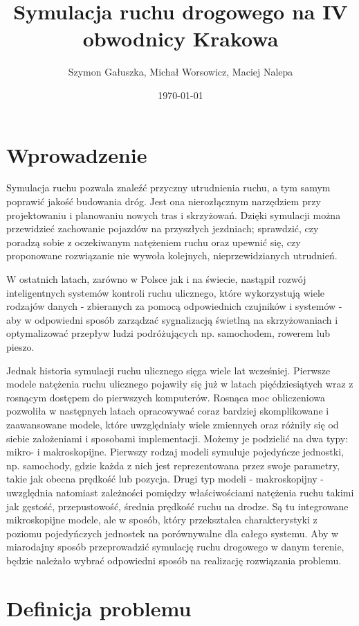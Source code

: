 \documentclass[a4paper,12pt]{article}
\title{Symulacja ruchu drogowego na IV obwodnicy Krakowa}
\author{Szymon Gałuszka, Michał Worsowicz, Maciej Nalepa}
\date{\today}
\begin{document}
	\maketitle
	
	\section{Wprowadzenie}
	Symulacja ruchu pozwala znaleźć przyczny utrudnienia ruchu, a tym samym poprawić jakość budowania dróg. Jest ona nierozłącznym narzędziem przy projektowaniu i planowaniu nowych tras i skrzyżowań. Dzięki symulacji można przewidzieć zachowanie pojazdów na przyszłych jezdniach; sprawdzić, czy poradzą sobie z oczekiwanym natężeniem ruchu oraz upewnić się, czy proponowane rozwiązanie nie wywoła kolejnych, nieprzewidzianych utrudnień.
	
	W ostatnich latach, zarówno w Polsce jak i na świecie, nastąpił rozwój inteligentnych systemów kontroli ruchu ulicznego, które wykorzystują wiele rodzajów danych - zbieranych za pomocą odpowiednich czujników i systemów - aby w  odpowiedni sposób zarządzać sygnalizacją świetlną na skrzyżowaniach i optymalizować przepływ ludzi podróżujących np. samochodem, rowerem lub pieszo.
	
	Jednak historia symulacji ruchu ulicznego sięga wiele lat wcześniej. Pierwsze modele natężenia ruchu ulicznego pojawiły się już w latach pięćdziesiątych wraz z rosnącym dostępem do pierwszych komputerów. Rosnąca moc obliczeniowa pozwoliła w następnych latach opracowywać coraz bardziej skomplikowane i zaawansowane modele, które uwzględniały wiele zmiennych oraz różniły się od siebie założeniami i sposobami implementacji. Możemy je podzielić na dwa typy: mikro- i makroskopijne. Pierwszy rodzaj modeli symuluje pojedyńcze jednostki, np. samochody, gdzie każda z nich jest reprezentowana przez swoje parametry, takie jak obecna prędkość lub pozycja. Drugi typ modeli - makroskopijny - uwzględnia natomiast zależności pomiędzy właściwościami natężenia ruchu takimi jak gęstość, przepustowość, średnia prędkość ruchu na drodze. Są tu integrowane mikroskopijne modele, ale w sposób, który przekształca charakterystyki z poziomu pojedyńczych jednostek na porównywalne dla całego systemu. Aby w miarodajny sposób przeprowadzić symulację ruchu drogowego w danym terenie, będzie należało wybrać odpowiedni sposób na realizację rozwiązania problemu.
	
	\section{Definicja problemu}
	
\end{document}
